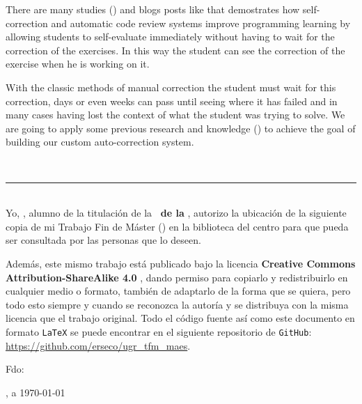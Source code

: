 {{\bigskip
There are many studies (\cite{benotti_effect_2018}) and blogs posts like \cite{noauthor_how_2019} that demostrates how  self-correction and automatic code review systems improve programming learning by allowing students to self-evaluate immediately without having to wait for the correction of the exercises. In this way the student can see the correction of the exercise when he is working on it.

\bigskip
With the classic methods of manual correction the student must wait for this correction, days or even weeks can pass until seeing where it has failed and in many cases having lost the context of what the student was trying to solve. We are going to apply some previous research and knowledge (\cite{rubio_uso_2018}) to achieve the goal of building our custom auto-correction system.


\newpage
\thispagestyle{empty}
\
\vspace{3cm}

\noindent\rule[-1ex]{\textwidth}{2pt}\\[4.5ex]

Yo, \textbf{\autor}, alumno de la titulación \textbf{\master} de la \textbf{\escuela\ de la \universidad}, autorizo la ubicación de la siguiente copia de mi Trabajo Fin de Máster (\textit{\titulo}) en la biblioteca del centro para que pueda ser consultada por las personas que lo deseen.

\bigskip
Además, este mismo trabajo está publicado bajo la licencia \textbf{Creative Commons Attribution-ShareAlike 4.0} \cite{CC}, dando permiso para copiarlo y redistribuirlo en cualquier medio o formato, también de adaptarlo de la forma que se quiera, pero todo esto siempre y cuando se reconozca la autoría y se distribuya con la misma licencia que el trabajo original. Todo el código fuente así como este documento en formato {\tt LaTeX} se puede encontrar en el siguiente repositorio de {\tt GitHub}: \url{https://github.com/erseco/ugr_tfm_maes}.

\vspace{4cm}

\noindent Fdo: \autor

\vspace{2cm}

\begin{flushright}
\ciudad, a \today
\end{flushright}

\newpage
\thispagestyle{empty}
\
\vspace{3cm}

}}
